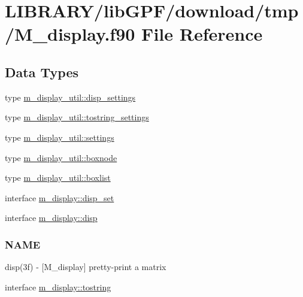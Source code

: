 \hypertarget{M__display_8f90}{}\section{L\+I\+B\+R\+A\+R\+Y/lib\+G\+P\+F/download/tmp/\+M\+\_\+display.f90 File Reference}
\label{M__display_8f90}
\subsection*{Data Types}
\begin{DoxyCompactItemize}
\item 
type \hyperlink{structm__display__util_1_1disp__settings}{m\+\_\+display\+\_\+util\+::disp\+\_\+settings}
\item 
type \hyperlink{structm__display__util_1_1tostring__settings}{m\+\_\+display\+\_\+util\+::tostring\+\_\+settings}
\item 
type \hyperlink{structm__display__util_1_1settings}{m\+\_\+display\+\_\+util\+::settings}
\item 
type \hyperlink{structm__display__util_1_1boxnode}{m\+\_\+display\+\_\+util\+::boxnode}
\item 
type \hyperlink{structm__display__util_1_1boxlist}{m\+\_\+display\+\_\+util\+::boxlist}
\item 
interface \hyperlink{interfacem__display_1_1disp__set}{m\+\_\+display\+::disp\+\_\+set}
\item 
interface \hyperlink{interfacem__display_1_1disp}{m\+\_\+display\+::disp}
\begin{DoxyCompactList}\small\item\em \subsubsection*{N\+A\+ME}

disp(3f) -\/ \mbox{[}M\+\_\+display\mbox{]} pretty-\/print a matrix \end{DoxyCompactList}\item 
interface \hyperlink{interfacem__display_1_1tostring}{m\+\_\+display\+::tostring}
\end{DoxyCompactItemize}
